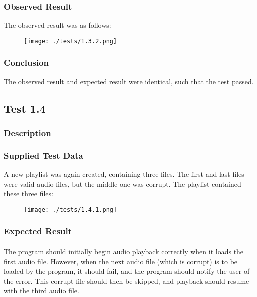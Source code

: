 \subsubsection*{Observed Result}
\label{sec:evidence1.3}
The observed result was as follows:
\begin{figure}[H]
	\texttt{[image: ./tests/1.3.2.png]}
\end{figure}

\subsubsection*{Conclusion}
The observed result and expected result were identical, such that the test passed.


\pagebreak
\subsection{Test 1.4}
\subsubsection*{Description}
\paragraph{}
{
	\centering
}

\subsubsection*{Supplied Test Data}
A new playlist was again created, containing three files. The first and last files were valid audio files, but the middle one was corrupt. The playlist contained these three files:
\begin{figure}[H]
	\texttt{[image: ./tests/1.4.1.png]}
\end{figure}

\subsubsection*{Expected Result}
\paragraph{}
The program should initially begin audio playback correctly when it loads the first audio file. However, when the next audio file (which is corrupt) is to be loaded by the program, it should fail, and the program should notify the user of the error. This corrupt file should then be skipped, and playback should resume with the third audio file.


